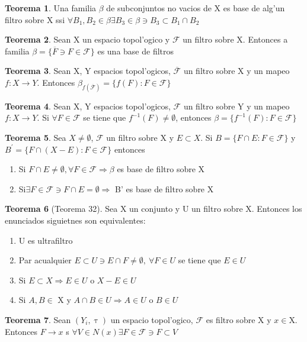 \documentclass{article}
\theoremstyle{definition}
\newtheorem{theorem}{Teorema}
\begin{document}
\begin{theorem}
	Una familia $\beta$ de subconjuntos no vacios de X es base de alg'un filtro sobre X ssi $\forall B_1,B_2 \in \beta\exists B_3\in\beta\ni B_3\subset B_1\cap B_2$
\end{theorem}
\begin{theorem}
	Sean X un espacio topol'ogico y $\mathcal{F}$ un filtro sobre X. Entonces a familia $\beta=\{\overline{F}\ni F\in \mathcal{F}\}$ es una base de filtros
\end{theorem}
\begin{theorem}
	Sean X, Y espacios topol'ogicos, $\overline{\mathcal{F}}$ un filtro sobre X y un mapeo $f:X\to Y$. Entonces $\beta_{f(\overline{\mathcal{F}})}=\{f(F):F\in \mathcal{F}\}$
\end{theorem}
\begin{theorem}
	Sean X, Y espacios topol'ogicos, $\mathcal{F}$ un filtro sobre Y y un mapeo $f:X\to Y$. Si $\forall F\in \mathcal{F}$ se tiene que $f^{-1}(F)\neq\emptyset$, entonces $\beta=\{f^{-1}(F):F\in \mathcal{F}\}$
\end{theorem}
\begin{theorem}
	Sea $X\neq\emptyset$, $\mathcal{F}$ un filtro sobre X y $E\subset X$. Si $B=\{F\cap E: F\in \mathcal{F}\}$ 
y $B^{'}=\{F\cap (X-E): F\in \mathcal{F}\}$ entonces 
	\begin{enumerate}
		\item Si $F\cap E\neq \emptyset, \forall F\in \mathcal{F}\Rightarrow \beta$ es base de filtro sobre X
		\item Si$\exists F\in \mathcal{F}\ni F\cap E = \emptyset \Rightarrow$ B' es base de filtro sobre X 
	\end{enumerate}
\end{theorem}
\begin{theorem}[Teorema 32]
	Sea X un conjunto y U un filtro sobre X. Entonces los enunciados siguietnes son equivalentes:
	\begin{enumerate}
		\item U es ultrafiltro
		\item Par acualquier $E\subset U\ni E\cap F\neq \emptyset,\ \forall F\in U$ se tiene que $E\in U$
		\item Si $E\subset X\Rightarrow E\in U$ o $X-E\in U$
		\item Si $A, B\in$ X y $ A\cap B\in U\Rightarrow A\in U$ o $ B\in U$
	\end{enumerate}
\end{theorem}
\begin{theorem}
	Sean $(Y_i,\uptau)$ un espacio topol'ogico, $\mathcal{F}$ es filtro sobre X y $x\in$X. Entonces $F\to x$ s $\forall V\in N(x)\exists F\in\mathcal{F}\ni F\subset V$
\end{theorem}
\end{document}
